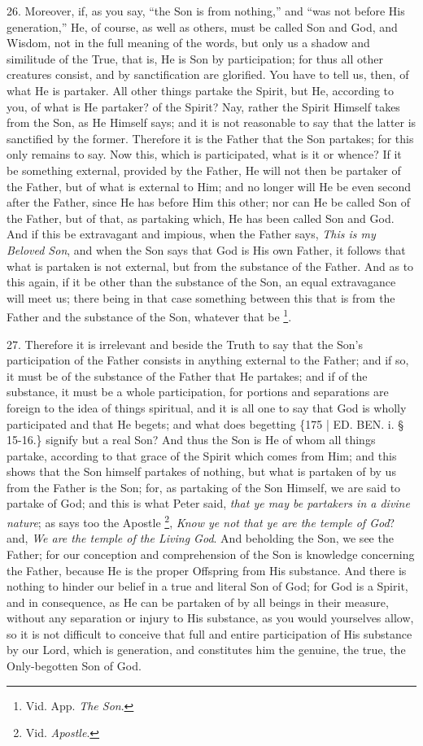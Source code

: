 26. Moreover, if, as you say, ``the
Son is from nothing,'' and ``was not before His generation,'' He, of
course, as well as others, must be called Son and God, and Wisdom, not
in the full meaning of the words, but only us a shadow and
similitude of the True, that is, He is Son by participation; for thus
all other creatures consist, and by sanctification are glorified. You
have to tell us, then, of what He is partaker. All other things
partake the Spirit, but He, according to you, of what is He partaker?
of the Spirit? Nay, rather the Spirit Himself takes from the Son, as
He Himself says; and it is not reasonable to say that the latter is
sanctified by the former. Therefore it is the Father that the Son
partakes; for this only remains to say. Now this, which is
participated, what is it or whence? If it be something external,
provided by the Father, He will not then be partaker of the Father,
but of what is external to Him; and no longer will He be even second
after the Father, since He has before Him this other; nor can He be
called Son of the Father, but of that, as partaking which, He has been
called Son and God. And if this be extravagant and impious, when the
Father says, \emph{This is my Beloved Son}, and when the Son says that
God is His own Father, it follows that what is partaken is not
external, but from the substance of the Father. And as to this again,
if it be other than the substance of the Son, an equal extravagance
will meet us; there being in that case something between this that is
from the Father and the substance of the Son, whatever that be \footnote{Vid. App. \emph{The Son}.}.

27. Therefore it is irrelevant
and beside the Truth to say that the Son's participation of the Father
consists in anything external to the Father; and if so, it must be of
the substance of the Father that He partakes; and if of the substance,
it must be a whole participation, for portions and separations are
foreign to the idea of things spiritual, and it is all one to say that
God is wholly participated and that He begets; and what does begetting
\{175 | ED.
BEN.
i. § 15-16.\} signify but a real Son? And thus the Son is He of whom
all things partake, according to that grace of the Spirit which comes
from Him; and this shows that the Son himself partakes of nothing, but
what is partaken of by us from the Father is the Son; for, as
partaking of the Son Himself, we are said to partake of God; and this
is what Peter said, \emph{that ye may be partakers in a divine nature};
as says too the Apostle \footnote{Vid. \emph{Apostle}.},
\emph{Know ye not that ye are the temple of God}? and, \emph{We are the
temple of the Living God}. And beholding the Son, we see the
Father; for our conception and comprehension of the Son is knowledge
concerning the Father, because He is the proper Offspring from His
substance. And there is nothing to hinder our belief in a true and
literal Son of God; for God is a Spirit, and in consequence, as He can
be partaken of by all beings in their measure, without any separation
or injury to His substance, as you would yourselves allow, so it is
not difficult to conceive that full and entire participation of His
substance by our Lord, which is generation, and constitutes him the
genuine, the true, the Only-begotten Son of God.

